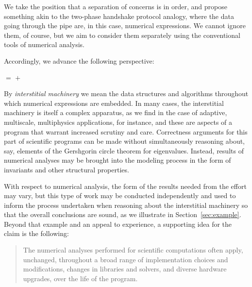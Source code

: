 \documentclass[11pt]{article}
\begin{document}
We take the position that a separation of concerns is in order, and
propose something akin to the two-phase handshake protocol
analogy, where the data going through the pipe are, in this case,
numerical expressions.  We cannot ignore them, of course, but we aim
to consider them separately using the conventional tools of numerical
analysis.

Accordingly, we advance the following perspective:
\begin{center}
  $\bm{=}$ 
  $\bm{+}$ 
\end{center}
By \emph{interstitial machinery} we mean the data structures and
algorithms throughout which numerical expressions are embedded.  In
many cases, the interstitial machinery is itself a complex apparatus,
as we find in the case of adaptive, multiscale, multiphysics
applications, for instance, and these are aspects of a program that
warrant increased scrutiny and care.  Correctness arguments for this
part of scientific programs can be made without simultaneously
reasoning about, say, elements of the Gershgorin circle theorem for
eigenvalues.  Instead, results of numerical analyses may be brought
into the modeling process in the form of invariants and other
structural properties.

With respect to numerical analysis, the form of the results needed
from the effort may vary, but this type of work may be conducted
independently and used to inform the process undertaken when reasoning
about the interstitial machinery so that the overall conclusions are
sound, as we illustrate in Section~\ref{sec:example}.  Beyond that
example and an appeal to experience, a supporting idea for
the claim is the following:
\begin{quote}
The numerical analyses performed for scientific computations often
apply, unchanged, throughout a broad range of implementation choices
and modifications, changes in libraries and solvers, and diverse
hardware upgrades, over the life of the program.
\end{quote}



{}
\end{document}
